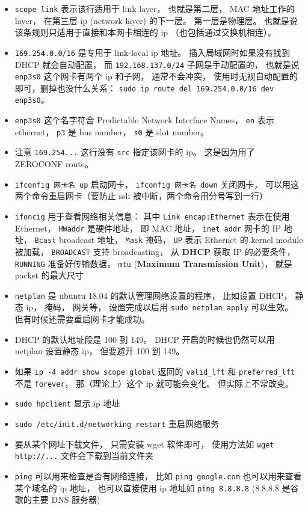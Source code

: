 \begin{itemize}
\item \verb`scope link` 表示该行适用于 link layer， 也就是第二层， MAC 地址工作的 layer， 在第三层 ip (network layer) 的下一层。 第一层是物理层。 也就是说该条规则只适用于直接和本网卡相连的 ip （也包括通过交换机相连）。
\item \verb`169.254.0.0/16` 是专用于 link-local ip 地址。 插入局域网时如果没有找到 DHCP 就会自动配置， 而 \verb`192.168.137.0/24` 子网是手动配置的， 也就是说 \verb`enp3s0` 这个网卡有两个 ip 和子网， 通常不会冲突， 使用时无视自动配置的即可，删掉也没什么关系： \verb`sudo ip route del 169.254.0.0/16 dev enp3s0`。
\item \verb`enp3s0` 这个名字符合 Predictable Network Interface Names， \verb`en` 表示 ethernet， \verb`p3` 是 bus number， \verb`s0` 是 slot number。
\item 注意 \verb`169.254...` 这行没有 \verb`src` 指定该网卡的 ip。 这是因为用了 ZEROCONF route。
\item \verb`ifconfig 网卡名 up` 启动网卡， \verb`ifconfig 网卡名 down` 关闭网卡， 可以用这两个命令重启网卡（要防止 ssh 被中断，两个命令用分号写到一行）
\item \verb`ifoncig` 用于查看网络相关信息： 其中 \verb`Link encap:Ethernet` 表示在使用 Ethernet， \verb`HWaddr` 是硬件地址， 即 MAC 地址， \verb`inet addr` 网卡的 IP 地址， \verb`Bcast` broadcast 地址， \verb`Mask` 掩码， \verb`UP` 表示 Ethernet 的 kernel module 被加载， \verb`BROADCAST` 支持 broadcasting， 从 \textbf{DHCP} 获取 IP 的必要条件， \verb`RUNNING` 准备好传输数据， \verb`mtu` (\textbf{Maximum Transmission Unit})， 就是 packet 的最大尺寸
\item \verb`netplan` 是 ubuntu 18.04 的默认管理网络设置的程序， 比如设置 DHCP， 静态 ip， 掩码， 网关等， 设置完成以后用 \verb`sudo netplan apply` 可以生效。 但有时候还需要重启网卡才能成功。
\item DHCP 的默认地址段是 100 到 149。 DHCP 开启的时候也仍然可以用 netplan 设置静态 ip， 但要避开 100 到 149。
\item 如果 \verb`ip -4 addr show scope global` 返回的 \verb`valid_lft` 和 \verb`preferred_lft` 不是 \verb`forever`， 那（理论上）这个 ip 就可能会变化。 但实际上不常改变。
\item \verb`sudo hpclient` 显示 ip 地址
\item \verb`sudo /etc/init.d/networking restart` 重启网络服务 
\item 要从某个网址下载文件， 只需安装 wget 软件即可， 使用方法如 \verb`wget http://...` 文件会下载到当前文件夹
\item \verb`ping` 可以用来检查是否有网络连接， 比如 \verb`ping google.com` 也可以用来查看某个域名的 ip 地址， 也可以直接使用 ip 地址如 \verb`ping 8.8.8.8` (8.8.8.8 是谷歌的主要 DNS 服务器)

\end{itemize}
